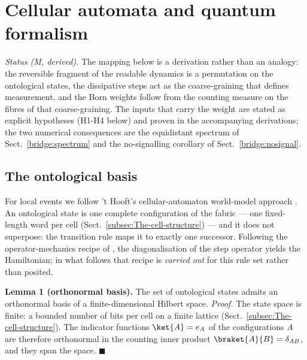 \section{Cellular automata and quantum formalism}\label{sec:bridge}
\emph{Status (M, derived).}  The mapping below is a derivation rather than an
analogy: the reversible fragment of the readable dynamics is a permutation on the
ontological states, the dissipative steps act as the coarse-graining that defines
measurement, and the Born weights follow from the counting measure on the fibres
of that coarse-graining.  The inputs that carry the weight are stated as explicit
hypotheses (H1-H4 below) and proven in the accompanying derivations; the two
numerical consequences are the equidistant spectrum of
Sect.~\ref{bridge:spectrum} and the no-signalling corollary of
Sect.~\ref{bridge:nosignal}.

\subsection{The ontological basis}\label{bridge:basis}
For local events we follow 't Hooft's cellular-automaton world-model approach
\cite{thooft}.  An ontological state is one complete configuration of the fabric
--- one fixed-length word per cell (Sect.~\ref{subsec:The-cell-structure}) --- and
it does not superpose: the transition rule maps it to exactly one successor.
Following the operator-mechanics recipe of \cite{thooft,Elze2019,rizzo2020perturbing},
the diagonalisation of the step operator yields the Hamiltonian; in what follows
that recipe is \emph{carried out} for this rule set rather than posited.

\textbf{Lemma 1 (orthonormal basis).}  The set of ontological states admits an
orthonormal basis of a finite-dimensional Hilbert space.
\emph{Proof.}  The state space is finite: a bounded number of bits per cell on a
finite lattice (Sect.~\ref{subsec:The-cell-structure}).  The indicator functions
$\ket{A}=e_{A}$ of the configurations $A$ are therefore orthonormal in the
counting inner product $\braket{A}{B}=\delta_{AB}$, and they span the space.
\hfill$\blacksquare$


